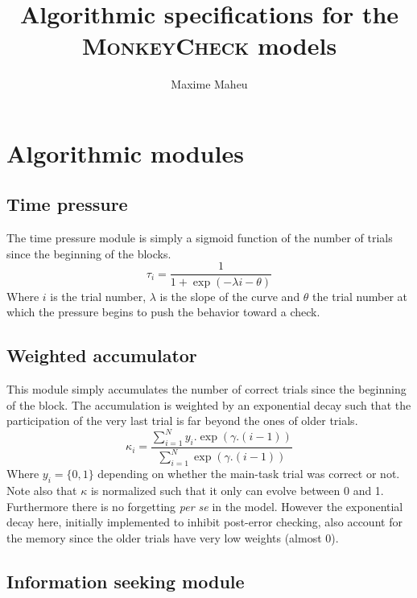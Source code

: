 \documentclass{article}
\title{Algorithmic specifications for the \textsc{MonkeyCheck} models}
\author{Maxime Maheu}
\begin{document}
\maketitle

\section{Algorithmic modules}

\subsection{Time pressure}

The time pressure module is simply a sigmoid function of the number of trials 
since the beginning of the blocks.
\begin{equation}
  \tau_{i} = \frac{1}{1 + \exp(-\lambda i - \theta)}
\end{equation}
Where $i$ is the trial number, $\lambda$ is the slope of the curve and $\theta$ the trial number at which the 
pressure begins to push the behavior toward a check.

\subsection{Weighted accumulator}

This module simply accumulates the number of correct trials since the beginning 
of the block. The accumulation is weighted by an exponential decay such that the 
participation of the very last trial is far beyond the ones of older trials.
\begin{equation}
  \kappa_{i} = \frac{\sum_{i=1}^{N} y_{i} . \exp(\gamma . (i-1))}{\sum_{i=1}^{N} \exp(\gamma . (i-1))}
\end{equation}
Where $y_{i}=\{0,1\}$ depending on whether the main-task trial was correct or not. Note also that $\kappa$ is normalized such that it only can evolve between 0 and 1. 
Furthermore there is no forgetting \textit{per se} in the model. However the exponential decay here, initially implemented to inhibit post-error checking, also account for 
the memory since the older trials have very low weights (almost 0).

\subsection{Information seeking module}
\end{document}
